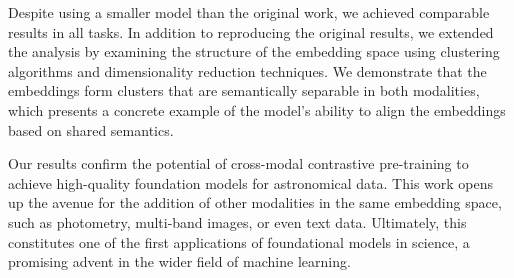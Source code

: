 \documentclass[a4paper,12pt]{article}
\begin{document}
Despite using a smaller model than the original work, we achieved comparable results in all tasks. In addition to reproducing the original results, we extended the analysis by examining the structure of the embedding space using clustering algorithms and dimensionality reduction techniques. We demonstrate that the embeddings form clusters that are semantically separable in both modalities, which presents a concrete example of the model's ability to align the embeddings based on shared semantics. 


Our results confirm the potential of cross-modal contrastive pre-training to achieve high-quality foundation models for astronomical data. This work opens up the avenue for the addition of other modalities in the same embedding space, such as photometry, multi-band images, or even text data. Ultimately, this constitutes one of the first applications of foundational models in science, a promising advent in the wider field of machine learning.





\newpage


\end{document}
